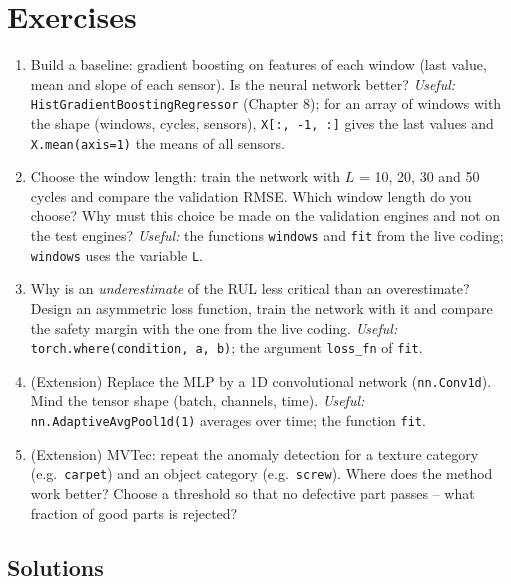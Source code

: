 \documentclass[
  letterpaper,
  DIV=11,
  numbers=noendperiod]{scrreprt}
\providecommand{\tightlist}{%
  \setlength{\itemsep}{0pt}\setlength{\parskip}{0pt}}\usepackage{longtable,booktabs,array}
\begin{document}
\section{Exercises}\label{exercises-12}

\begin{enumerate}
\def\labelenumi{\arabic{enumi}.}
\tightlist
\item
  Build a baseline: gradient boosting on features of each window (last
  value, mean and slope of each sensor). Is the neural network better?
  \emph{Useful:} \texttt{HistGradientBoostingRegressor} (Chapter 8); for
  an array of windows with the shape (windows, cycles, sensors),
  \texttt{X{[}:,\ -1,\ :{]}} gives the last values and
  \texttt{X.mean(axis=1)} the means of all sensors.
\item
  Choose the window length: train the network with \(L\) = 10, 20, 30
  and 50 cycles and compare the validation RMSE. Which window length do
  you choose? Why must this choice be made on the validation engines and
  not on the test engines? \emph{Useful:} the functions \texttt{windows}
  and \texttt{fit} from the live coding; \texttt{windows} uses the
  variable \texttt{L}.
\item
  Why is an \emph{underestimate} of the RUL less critical than an
  overestimate? Design an asymmetric loss function, train the network
  with it and compare the safety margin with the one from the live
  coding. \emph{Useful:} \texttt{torch.where(condition,\ a,\ b)}; the
  argument \texttt{loss\_fn} of \texttt{fit}.
\item
  (Extension) Replace the MLP by a 1D convolutional network
  (\texttt{nn.Conv1d}). Mind the tensor shape (batch, channels, time).
  \emph{Useful:} \texttt{nn.AdaptiveAvgPool1d(1)} averages over time;
  the function \texttt{fit}.
\item
  (Extension) MVTec: repeat the anomaly detection for a texture category
  (e.g.~\texttt{carpet}) and an object category (e.g.~\texttt{screw}).
  Where does the method work better? Choose a threshold so that no
  defective part passes -- what fraction of good parts is rejected?
\end{enumerate}

\subsection{Solutions}\label{solutions-12}
\end{document}
